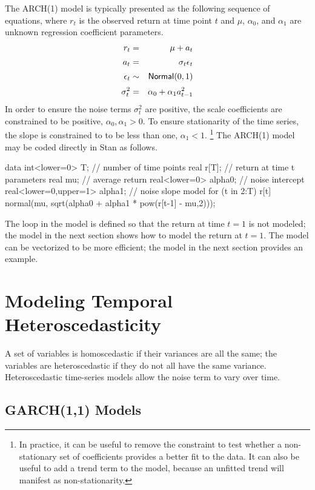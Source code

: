 The ARCH(1) model is typically presented as the following sequence of
equations, where $r_t$ is the observed return at time point $t$
and $\mu$, $\alpha_0$, and $\alpha_1$ are unknown regression coefficient parameters.
%
\begin{eqnarray*}
r_t & = & \mu + a_t 
\\[2pt]
a_t & = & \sigma_t \epsilon_t
\\[2pt]
\epsilon_t & \sim & \distro{Normal}(0,1)
\\[2pt]
\sigma^2_t & = & \alpha_0 + \alpha_1 a_{t-1}^2
\end{eqnarray*}
%
In order to ensure the noise terms $\sigma^2_t$ are positive, the
scale coefficients are constrained to be positive, $\alpha_0, \alpha_1
> 0$.  To ensure stationarity of the time series, the slope is 
constrained to to be less than one, $\alpha_1 < 1$.%
%
\footnote{In practice, it can be useful to remove the constraint to
  test whether a non-stationary set of coefficients provides a better
  fit to the data.  It can also be useful to add a trend term to the
  model, because an unfitted trend will manifest as non-stationarity.}
%
The ARCH(1) model may be coded directly in Stan as follows.
%
\begin{stancode}
data {
  int<lower=0> T;   // number of time points
  real r[T];        // return at time t
}
parameters {
  real mu;                       // average return
  real<lower=0> alpha0;          // noise intercept
  real<lower=0,upper=1> alpha1;  // noise slope
}
model {
  for (t in 2:T)
    r[t] ~ normal(mu, sqrt(alpha0 + alpha1 * pow(r[t-1] - mu,2)));
}
\end{stancode}
%
The loop in the model is defined so that the return at time $t=1$ is
not modeled; the model in the next section shows how to model the
return at $t=1$.  The model can be vectorized to be more efficient;
the model in the next section provides an example.

\section{Modeling Temporal Heteroscedasticity}

A set of variables is homoscedastic if their variances are all the
same; the variables are heteroscedastic if they do not all have the
same variance.  Heteroscedastic time-series models allow the noise
term to vary over time.

\subsection{GARCH(1,1) Models}

